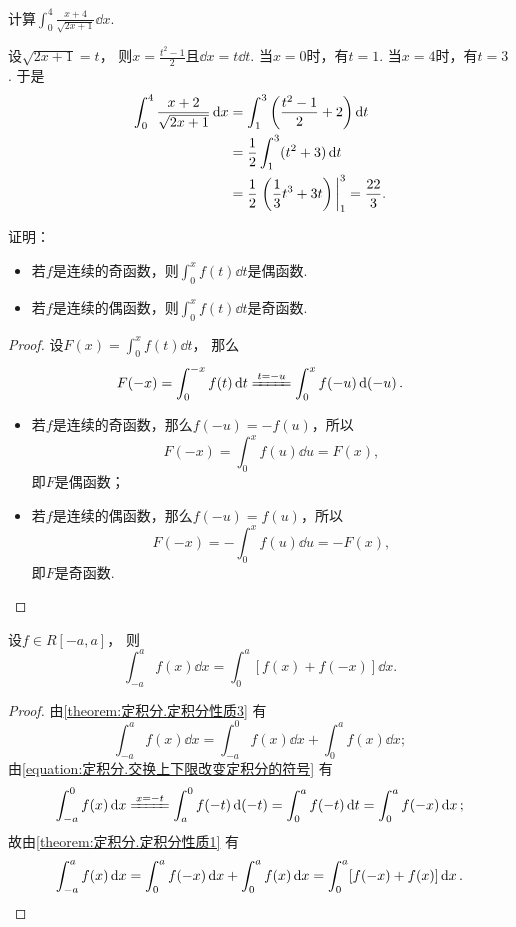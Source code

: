\begin{example}
计算\(\int_0^4 \frac{x+4}{\sqrt{2x+1}} \dd{x}\).
\begin{solution}
设\(\sqrt{2x+1}=t\)，
则\(x=\frac{t^2-1}2\)且\(\dd{x}=t\dd{t}\).
当\(x=0\)时，有\(t=1\).
当\(x=4\)时，有\(t=3\).
于是\begin{align*}
	\int_0^4 \frac{x+2}{\sqrt{2x+1}} \dd{x}
	&= \int_1^3 \left(\frac{t^2-1}2+2\right) \dd{t} \\
	&= \frac12 \int_1^3 (t^2+3) \dd{t} \\
	&= \frac12 \eval{\left(\frac13 t^3 + 3t\right)}_1^3
	= \frac{22}3.
\end{align*}
\end{solution}
\end{example}

\begin{example}
证明：\begin{itemize}
	\item 若\(f\)是连续的奇函数，则\(\int_0^x f(t) \dd{t}\)是偶函数.
	\item 若\(f\)是连续的偶函数，则\(\int_0^x f(t) \dd{t}\)是奇函数.
\end{itemize}
\begin{proof}
设\(F(x) = \int_0^x f(t) \dd{t}\)，
那么\[
	F(-x) = \int_0^{-x} f(t) \dd{t}
	\xlongequal{t=-u} \int_0^x f(-u) \dd(-u).
\]
\begin{itemize}
	\item 若\(f\)是连续的奇函数，那么\(f(-u) = -f(u)\)，所以\[
		F(-x) = \int_0^x f(u) \dd{u} = F(x),
	\]
	即\(F\)是偶函数；

	\item 若\(f\)是连续的偶函数，那么\(f(-u) = f(u)\)，所以\[
		F(-x) = -\int_0^x f(u) \dd{u} = -F(x),
	\]
	即\(F\)是奇函数.
	\qedhere
\end{itemize}
\end{proof}
\end{example}

\begin{proposition}\label{theorem:定积分.利用对称性简化计算0}
设\(f \in R[-a,a]\)，
则\begin{equation}
	\int_{-a}^a f(x) \dd{x} = \int_0^a [f(x) + f(-x)] \dd{x}.
\end{equation}
\begin{proof}
由\cref{theorem:定积分.定积分性质3} 有\[
	\int_{-a}^a f(x) \dd{x}
	= \int_{-a}^0 f(x) \dd{x}
	+ \int_0^a f(x) \dd{x};
\]
由\cref{equation:定积分.交换上下限改变定积分的符号} 有\[
	\int_{-a}^0 f(x) \dd{x}
	\xlongequal{x=-t} \int_a^0 f(-t) \dd(-t)
	= \int_0^a f(-t) \dd{t}
	= \int_0^a f(-x) \dd{x};
\]
故由\cref{theorem:定积分.定积分性质1} 有\[
	\int_{-a}^a f(x) \dd{x}
	= \int_0^a f(-x) \dd{x} + \int_0^a f(x) \dd{x}
	= \int_0^a [f(-x) + f(x)] \dd{x}.
	\qedhere
\]
\end{proof}
\end{proposition}


